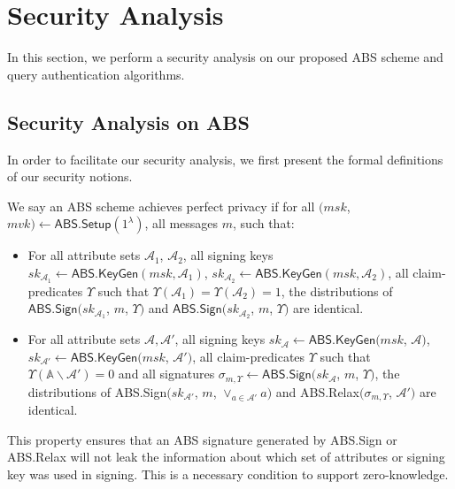 \section{Security Analysis}\label{sec:access-control:security-analysis}

In this section, we perform a security analysis on our proposed ABS scheme and query authentication algorithms.

\subsection{Security Analysis on ABS}\label{sec:access-control:security-analysis-abs}

In order to facilitate our security analysis, we first present the formal definitions of our security notions.

\begin{definition}\label{def:access-control:abs-privacy}
  We say an ABS scheme achieves perfect privacy if for all $(msk$, $mvk) \gets \textsf{ABS.Setup}(1^\lambda)$, all messages $m$, such that:
  \begin{itemize}
    \item For all attribute sets $\mathcal{A}_1$, $\mathcal{A}_2$, all signing keys ${sk}_{\mathcal{A}_1} \gets \textsf{ABS.KeyGen}(msk, \mathcal{A}_1)$, ${sk}_{\mathcal{A}_2} \gets \textsf{ABS.KeyGen}(msk, \mathcal{A}_2)$, all claim-predicates $\Upsilon$ such that $\Upsilon(\mathcal{A}_1)=\Upsilon(\mathcal{A}_2)=1$, the distributions of $\textsf{ABS.Sign}({sk}_{\mathcal{A}_1}$, $m$, $\Upsilon)$ and $\textsf{ABS.Sign}({sk}_{\mathcal{A}_2}$, $m$, $\Upsilon)$ are identical.
    \item For all attribute sets $\mathcal{A}, \mathcal{A}'$, all signing keys ${sk}_{\mathcal{A}} \gets \textsf{ABS.KeyGen}(msk$, $\mathcal{A})$, ${sk}_{\mathcal{A}'} \gets \textsf{ABS.KeyGen}(msk$, $\mathcal{A}')$, all claim-predicates $\Upsilon$ such that $\Upsilon(\mathbb{A}\backslash\mathcal{A}') = 0$ and all signatures $\sigma_{m, \Upsilon} \gets \textsf{ABS.Sign}({sk}_{\mathcal{A}}$, $m$, $\Upsilon)$, the distributions of \textsf{ABS.Sign}$(sk_{\mathcal{A}'}$, $m$, $\lor_{a \in \mathcal{A}'} a)$ and \textsf{ABS.Relax}$(\sigma_{m, \Upsilon}$, $\mathcal{A}')$ are identical.
  \end{itemize}
\end{definition}
This property ensures that an ABS signature generated by \textsf{ABS.Sign} or \textsf{ABS.Relax} will not leak the information about which set of attributes or signing key was used in signing. This is a necessary condition to support zero-knowledge.

